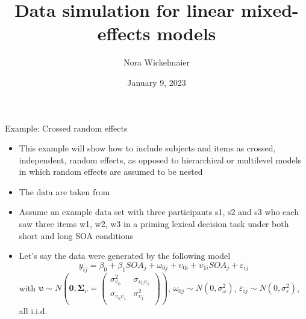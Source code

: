 \documentclass[aspectratio=169]{beamer}
\title{Data simulation for linear mixed-effects models}
\author{Nora Wickelmaier}
\date{January 9, 2023}
\newcommand{\gvect}[1]{\boldsymbol{#1}}
\newcommand{\gmat}[1]{\boldsymbol{#1}}
\begin{document}
\begin{frame}{}
\thispagestyle{empty}
\titlepage
\end{frame}



\begin{frame}{Example: Crossed random effects}
  \begin{itemize}
    \item This example will show how to include subjects and items as
      crossed, independent, random effects, as opposed to hierarchical or
      multilevel models in which random effects are assumed to be nested
    \item The data are taken from \citet{Baayen2008}
    \item Assume an example data set with three participants s1, s2 and s3
      who each saw three items w1, w2, w3 in a priming lexical decision
      task under both short and long SOA conditions
    \item Let's say the data were generated by the following model
  \[
    y_{ij} = \beta_0 + \beta_1 SOA_j + \omega_{0j} + \upsilon_{0i} +
      \upsilon_{1i} SOA_j + \varepsilon_{ij} 
  \]
\small
with $\gvect{\upsilon} \sim N\left(\gvect{0}, \gmat{\Sigma}_{\upsilon} = 
    \begin{pmatrix}
      \sigma^2_{\upsilon_0} & \sigma_{\upsilon_0\upsilon_1} \\
      \sigma_{\upsilon_0\upsilon_1} & \sigma^2_{\upsilon_1} \\
    \end{pmatrix}\right)$,
      $\omega_{0j} \sim N(0, \sigma_{\omega}^2)$, $\varepsilon_{ij} \sim N(0,
  \sigma_{\varepsilon}^2)$, all i.i.d. 
  \end{itemize}
\end{frame}
\end{document}
